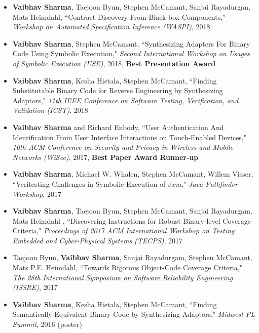 \documentclass[letterpaper,10pt]{article}
\begin{document}
\begin{itemize}
\item
{\bf Vaibhav Sharma}, Taejoon Byun, Stephen McCamant, Sanjai Rayadurgan, Mats Heimdahl, ``Contract Discovery From Black-box Components," \textit{Workshop on Automated Specification Inference (WASPI)}, 2018
\item
{\bf Vaibhav Sharma}, Stephen McCamant, ``Synthesizing Adapters For Binary Code Using Symbolic Execution," \textit{Second International Workshop on Usages of Symbolic Execution (USE)}, 2018, {\bf Best Presentation Award}
\item
{\bf Vaibhav Sharma}, Kesha Hietala, Stephen McCamant, ``Finding Substitutable Binary Code for Reverse Engineering by Synthesizing Adaptors," \textit{11th IEEE Conference on Software Testing, Verification, and Validation (ICST)}, 2018
\item
{\bf Vaibhav Sharma} and Richard Enbody, ``User Authentication And Identification From User Interface Interactions on Touch-Enabled Devices," \textit{10th ACM Conference on Security and Privacy in Wireless and Mobile Networks (WiSec)}, 2017, {\bf Best Paper Award Runner-up}
\item
{\bf Vaibhav Sharma}, Michael W. Whalen, Stephen McCamant, Willem Visser, ``Veritesting Challenges in Symbolic Execution of Java," \textit{Java Pathfinder Workshop}, 2017
\item
{\bf Vaibhav Sharma}, Taejoon Byun, Stephen McCamant, Sanjai Rayadurgam, Mats Heimdahl , ``Discovering Instructions for Robust Binary-level Coverage Criteria," \textit{Proceedings of 2017 ACM International Workshop on Testing Embedded and Cyber-Physical Systems (TECPS)}, 2017
\item
Taejoon Byun, {\bf Vaibhav Sharma}, Sanjai Rayadurgam, Stephen McCamant, Mats P.E. Heimdahl, ``Towards Rigorous Object-Code Coverage Criteria," \textit{The 28th International Symposium on Software Reliability Engineering (ISSRE)}, 2017
\item
{\bf Vaibhav Sharma}, Kesha Hietala, Stephen McCamant, ``Finding Semantically-Equivalent Binary Code by Synthesizing Adaptors," \textit{Midwest PL Summit}, 2016 (poster) 
\end{itemize}
\end{document}
